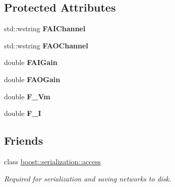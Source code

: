 \subsection*{Protected Attributes}
\begin{DoxyCompactItemize}
\item 
\hypertarget{class_t_cell_a602de7c2375475244dbde16fc32863db}{std\+::wstring {\bfseries F\+A\+I\+Channel}}\label{class_t_cell_a602de7c2375475244dbde16fc32863db}

\item 
\hypertarget{class_t_cell_a538983b268916cbed077d82b8a2d478c}{std\+::wstring {\bfseries F\+A\+O\+Channel}}\label{class_t_cell_a538983b268916cbed077d82b8a2d478c}

\item 
\hypertarget{class_t_cell_aef8b4ac3536dcb9a0b100452500d5a6a}{double {\bfseries F\+A\+I\+Gain}}\label{class_t_cell_aef8b4ac3536dcb9a0b100452500d5a6a}

\item 
\hypertarget{class_t_cell_a7794f29d89012e170e50fbe116d7afd1}{double {\bfseries F\+A\+O\+Gain}}\label{class_t_cell_a7794f29d89012e170e50fbe116d7afd1}

\item 
\hypertarget{class_t_cell_ac83e5843dfdaff29d20bd6fe3c1c1b22}{double {\bfseries F\+\_\+\+Vm}}\label{class_t_cell_ac83e5843dfdaff29d20bd6fe3c1c1b22}

\item 
\hypertarget{class_t_cell_a16116f4581383ebf84d3d8d0650afe60}{double {\bfseries F\+\_\+\+I}}\label{class_t_cell_a16116f4581383ebf84d3d8d0650afe60}

\end{DoxyCompactItemize}
\subsection*{Friends}
\begin{DoxyCompactItemize}
\item 
\hypertarget{class_t_cell_ac98d07dd8f7b70e16ccb9a01abf56b9c}{class \hyperlink{class_t_cell_ac98d07dd8f7b70e16ccb9a01abf56b9c}{boost\+::serialization\+::access}}\label{class_t_cell_ac98d07dd8f7b70e16ccb9a01abf56b9c}

\begin{DoxyCompactList}\small\item\em Required for serialization and saving networks to disk. \end{DoxyCompactList}\end{DoxyCompactItemize}



